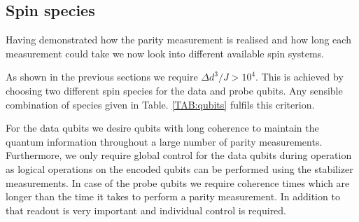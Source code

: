 
\subsection{Spin species}

Having demonstrated how the parity measurement is realised and how long each measurement could take we now look into different available spin systems. 

As shown in the previous sections we require $\Delta d^3/ J > 10^4$. This is achieved by choosing two different spin species for the data and probe qubits. Any sensible combination of species given in Table. \ref*{TAB:qubits} fulfils this criterion.

For the data qubits we desire qubits with long coherence to maintain the quantum information throughout a large number of parity measurements. Furthermore, we only require global control for the data qubits during operation as logical operations on the encoded qubits can be performed using the stabilizer measurements.
In case of the probe qubits we require coherence times which are longer than the time it takes to perform a parity measurement. In addition to that readout is very important and individual control is required.

